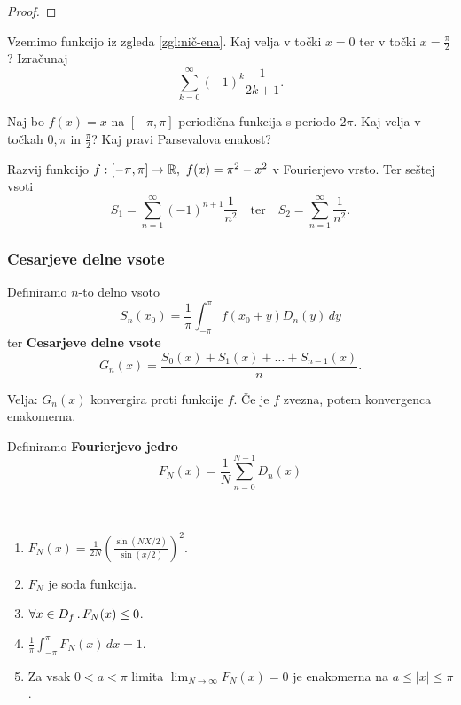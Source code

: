 \begin{proof}
    \todo{}
\end{proof}

\begin{zgled}
    Vzemimo funkcijo iz zgleda \ref{zgl:nič-ena}. Kaj velja v točki \(x =0\) ter v točki \(x = \frac{\pi}{2}\)? Izračunaj \[
        \sum_{k=0}^{\infty}(-1)^{k}\frac{1}{2k+1}.
    \]
\end{zgled}

\begin{zgled}
    Naj bo \(f(x) = x\) na \([-\pi, \pi]\) periodična funkcija s periodo \(2\pi\). Kaj velja v točkah \(0, \pi\) in \(\frac{\pi}{2}\)? Kaj pravi Parsevalova enakost?
\end{zgled}

\begin{zgled}
    Razvij funkcijo \(f: [-\pi, \pi] \to \R, \ f(x) = \pi^2 - x^2\) v Fourierjevo vrsto. Ter seštej vsoti 
    \[
        S_1 = \sum_{n=1}^{\infty} (-1)^{n+1} \frac{1}{n^2} \quad \text{ter} \quad S_2 = \sum_{n=1}^{\infty} \frac{1}{n^2}.
    \]
\end{zgled}

\subsubsection{Cesarjeve delne vsote}
Definiramo \(n\)-to delno vsoto
\[
    S_n(x_0) = \frac{1}{\pi} \int_{-\pi}^{\pi} f(x_0 + y)D_n(y) \, dy
\]
ter \textbf{Cesarjeve delne vsote}
\[
    G_n(x) = \frac{S_0(x) + S_1(x) + \ldots + S_{n-1}(x)}{n}.
\]

Velja: \(G_n(x)\) konvergira proti funkcije \(f\). Če je \(f\) zvezna, potem konvergenca enakomerna. 

Definiramo \textbf{Fourierjevo jedro}
\[
    F_N(x) = \frac{1}{N}\sum_{n=0}^{N-1} D_n(x)
\]

\begin{trditev}
    \ 
    \begin{enumerate}
        \item \(F_N(x) = \frac{1}{2N} \left(\frac{\sin(NX/2)}{\sin(x/2)}\right)^2\).
        \item \(F_N\) je soda funkcija.
        \item \(\forall x \in D_f \,.\, F_N(x) \leq 0\).
        \item \(\frac{1}{\pi} \int_{-\pi}^{\pi} F_N(x) \, dx = 1\).
        \item Za vsak \(0 < a < \pi\) limita \(\lim_{N \to \infty} F_N(x) = 0\) je enakomerna na \(a \leq |x| \leq \pi\).
    \end{enumerate}
\end{trditev}


